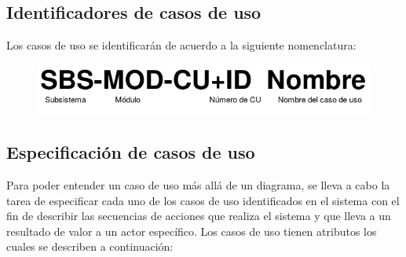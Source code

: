 \pagebreak

\subsection{Identificadores de casos de uso}

Los casos de uso se identificarán de acuerdo a la siguiente nomenclatura:

\begin{figure}[hbtp!]
	\begin{center}
		\includegraphics[width=.7\textwidth]{LIT/UCnombre}
	\end{center}
	\label{fig:nomenclatura}
\end{figure}


\subsection{Especificación de casos de uso}

Para poder entender un caso de uso más allá de un diagrama, se lleva a cabo la tarea de especificar cada uno de los casos de uso identificados en el sistema con el fin de describir las secuencias de acciones que realiza el sistema y que lleva a un resultado de valor a un actor específico. Los casos de uso tienen atributos los cuales se describen a continuación:

